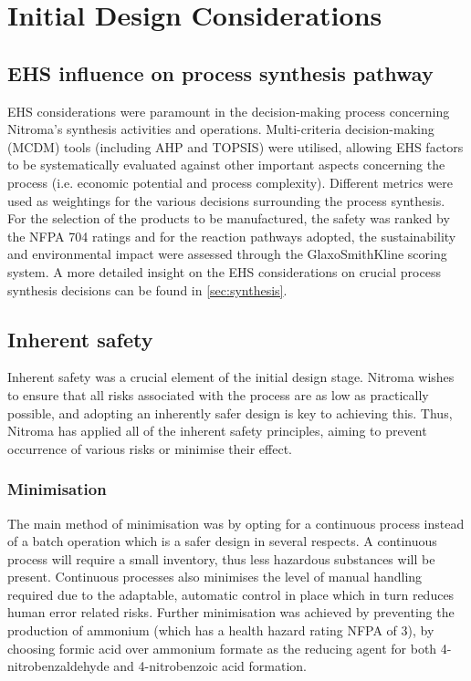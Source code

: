  
\section{Initial Design Considerations}

\subsection{EHS influence on process synthesis pathway}

EHS considerations were paramount in the decision-making process concerning Nitroma’s synthesis activities and operations. Multi-criteria decision-making (MCDM) tools (including AHP and TOPSIS) were utilised, allowing EHS factors to be systematically evaluated against other important aspects concerning the process (i.e. economic potential and process complexity). Different metrics were used as weightings for the various decisions surrounding the process synthesis. For the selection of the products to be manufactured, the safety was ranked by the NFPA 704 ratings and for the reaction pathways adopted, the sustainability and environmental impact were assessed through the GlaxoSmithKline scoring system. A more detailed insight on the EHS considerations on crucial process synthesis decisions can be found in \cref{sec:synthesis}. 

\subsection{Inherent safety}
\label{sec:inherentsafety}

Inherent safety was a crucial element of the initial design stage. Nitroma wishes to ensure that all risks associated with the process are as low as practically possible, and adopting an inherently safer design is key to achieving this. Thus, Nitroma has applied all of the inherent safety principles, aiming to prevent occurrence of various risks or minimise their effect.

\subsubsection{Minimisation}
The main method of minimisation was by opting for a continuous process instead of a batch operation which is a safer design in several respects. A continuous process will require a small inventory, thus less hazardous substances will be present. Continuous processes also minimises the level of manual handling required due to the adaptable, automatic control in place which in turn reduces human error related risks. 
Further minimisation was achieved by preventing the production of ammonium (which has a health hazard rating NFPA of 3), by choosing formic acid over ammonium formate as the reducing agent for both 4-nitrobenzaldehyde and 4-nitrobenzoic acid formation. 



